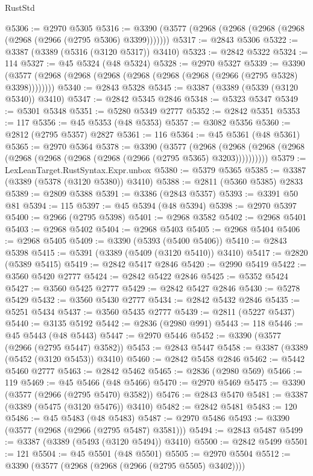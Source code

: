 \begin{lexlean}{RustStd}
\begin{coremodule}
@5306 := @2970 @5305
@5316 := @3390 (@3577 (@2968 (@2968 (@2968 (@2968 (@2968 (@2966 (@2795 @5306) @3399)))))))
@5317 := @2843 @5306
@5322 := @3387 (@3389 (@5316 (@3120 @5317)) @3410)
@5323 := @2842 @5322
@5324 := 114
@5327 := @45 @5324 (@48 @5324)
@5328 := @2970 @5327
@5339 := @3390 (@3577 (@2968 (@2968 (@2968 (@2968 (@2968 (@2968 (@2966 (@2795 @5328) @3398))))))))
@5340 := @2843 @5328
@5345 := @3387 (@3389 (@5339 (@3120 @5340)) @3410)
@5347 := @2842 @5345 @2846
@5348 := @5323 @5347
@5349 := @5301 @5348
@5351 := @5280 @5349 @2777
@5352 := @2842 @5351
@5353 := 117
@5356 := @45 @5353 (@48 @5353)
@5357 := @3082 @5356
@5360 := @2812 (@2795 @5357) @2827
@5361 := 116
@5364 := @45 @5361 (@48 @5361)
@5365 := @2970 @5364
@5378 := @3390
    (@3577
      (@2968 (@2968 (@2968 (@2968 (@2968 (@2968 (@2968 (@2968 (@2966 (@2795 @5365) @3203))))))))))
@5379 := LexLeanTarget.RustSyntax.Expr.unbox
@5380 := @5379 @5365
@5385 := @3387 (@3389 (@5378 (@3120 @5380)) @3410)
@5388 := @2811 (@5360 @5385) @2833
@5389 := @2809 @5388
@5391 := @3386 (@2843 @5357)
@5393 := @3391 @50 @81
@5394 := 115
@5397 := @45 @5394 (@48 @5394)
@5398 := @2970 @5397
@5400 := @2966 (@2795 @5398)
@5401 := @2968 @3582
@5402 := @2968 @5401
@5403 := @2968 @5402
@5404 := @2968 @5403
@5405 := @2968 @5404
@5406 := @2968 @5405
@5409 := @3390 (@5393 (@5400 @5406))
@5410 := @2843 @5398
@5415 := @5391 (@3389 (@5409 (@3120 @5410)) @3410)
@5417 := @2820 (@5389 @5415)
@5419 := @2842 @5417 @2846
@5420 := @2990 @5419
@5422 := @3560 @5420 @2777
@5424 := @2842 @5422 @2846
@5425 := @5352 @5424
@5427 := @3560 @5425 @2777
@5429 := @2842 @5427 @2846
@5430 := @5278 @5429
@5432 := @3560 @5430 @2777
@5434 := @2842 @5432 @2846
@5435 := @5251 @5434
@5437 := @3560 @5435 @2777
@5439 := @2811 (@5227 @5437)
@5440 := @3135 @5192
@5442 := @2836 (@2980 @991)
@5443 := 118
@5446 := @45 @5443 (@48 @5443)
@5447 := @2970 @5446
@5452 := @3390 (@3577 (@2966 (@2795 @5447) @3582))
@5453 := @2843 @5447
@5458 := @3387 (@3389 (@5452 (@3120 @5453)) @3410)
@5460 := @2842 @5458 @2846
@5462 := @5442 @5460 @2777
@5463 := @2842 @5462
@5465 := @2836 (@2980 @569)
@5466 := 119
@5469 := @45 @5466 (@48 @5466)
@5470 := @2970 @5469
@5475 := @3390 (@3577 (@2966 (@2795 @5470) @3582))
@5476 := @2843 @5470
@5481 := @3387 (@3389 (@5475 (@3120 @5476)) @3410)
@5482 := @2842 @5481
@5483 := 120
@5486 := @45 @5483 (@48 @5483)
@5487 := @2970 @5486
@5493 := @3390 (@3577 (@2968 (@2966 (@2795 @5487) @3581)))
@5494 := @2843 @5487
@5499 := @3387 (@3389 (@5493 (@3120 @5494)) @3410)
@5500 := @2842 @5499
@5501 := 121
@5504 := @45 @5501 (@48 @5501)
@5505 := @2970 @5504
@5512 := @3390 (@3577 (@2968 (@2968 (@2966 (@2795 @5505) @3402))))

\end{coremodule}
\end{lexlean}

